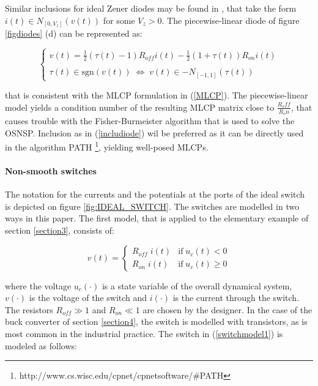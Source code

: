 Similar inclusions for ideal Zener diodes may be found in \cite{acary-brogliato2008,addi2009}, that take the form $i(t) \in N_{[0,V_{z}]}(v(t))$ for some $V_{z} >0$. The piecewise-linear  diode of figure \ref{figdiodes} (d) can be represented as:


\begin{equation}\label{includiode2}
\left\{\begin{array}{l}
v(t)=\frac{1}{2}(\tau(t)-1) R_{off} i(t) -\frac{1}{2}(1+\tau(t)) R_{on} i(t) \\ \\ \tau(t) \in \mbox{sgn}(v(t))\; \Leftrightarrow \; v(t) \in - N_{[-1,1]}(\tau(t))
\end{array}\right.
\end{equation}

that is consistent with the MLCP formulation in (\ref{MLCP}). The piecewise-linear model yields a condition number of the resulting MLCP matrix close to $\frac{R_off}{R_on}$, that causes trouble with the Fisher-Burmeister algorithm that is used to solve the OSNSP. Inclusion as in (\ref{includiode})  wil be preferred as it can be directly used in the algorithm PATH \footnote{http://www.cs.wisc.edu/cpnet/cpnetsoftware/$\#$PATH}, yielding well-posed MLCPs. 



\paragraph{Non-smooth switches}  The notation for the currents and the potentials at the ports of the ideal switch is depicted on figure \ref{fig:IDEAL_SWITCH}. The switches are modelled in two ways in this paper. The first model, that is applied to the elementary example of section \ref{section3}, consists of:

\begin{equation}\label{switchmodel1}
v(t)=\left\{\begin{array}{ll} R_{off}\; i(t) & \mbox{if}\;u_{c}(t) < 0 \\   R_{on}\; i(t) & \mbox{if}\;u_{c}(t) \geq  0  \end{array}\right.
\end{equation} 

where the voltage $u_{c}(\cdot)$ is a state variable of the overall dynamical system, $v(\cdot)$ is the voltage of the switch and $i(\cdot)$ is the current through the switch. The resistors $R_{off} \gg 1$ and $R_{on} \ll 1$ are chosen by the designer. In the case of the buck converter of section \ref{section4}, the switch is modelled with transistors, as is most common in the industrial practice. The switch in (\ref{switchmodel1}) is modeled as follows:

